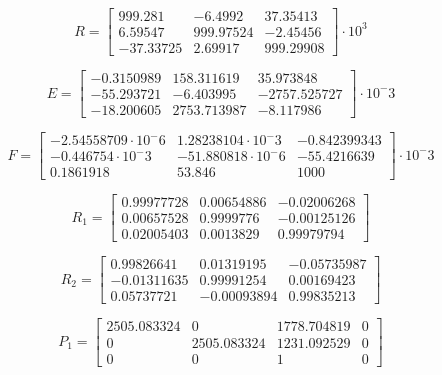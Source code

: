 \begin{equation}\label{eq::R}
R = \begin{bmatrix}
999.281 & -6.4992 & 37.35413 \\
6.59547 & 999.97524 & -2.45456 \\
-37.33725 & 2.69917 & 999.29908
\end{bmatrix}\cdot10^3
\end{equation}

\begin{equation}\label{eq::E}
E = \begin{bmatrix}
-0.3150989 & 158.311619 & 35.973848 \\
-55.293721 & -6.403995 & -2757.525727 \\
-18.200605 & 2753.713987 & -8.117986
\end{bmatrix}\cdot10^-3
\end{equation}

\begin{equation}\label{eq::F}
F = \begin{bmatrix}
-2.54558709\cdot10^-6 & 1.28238104\cdot10^-3 & -0.842399343\\
-0.446754\cdot10^-3 & -51.880818\cdot10^-6 & -55.4216639\\
0.1861918 & 53.846 & 1000
\end{bmatrix}\cdot10^-3
\end{equation}

\begin{equation}\label{eq::R1}
R_1 = \begin{bmatrix}
0.99977728 & 0.00654886 & -0.02006268\\
0.00657528 & 0.9999776 & -0.00125126\\
0.02005403 & 0.0013829 & 0.99979794
\end{bmatrix}
\end{equation}

\begin{equation}\label{eq::R2}
R_2 = \begin{bmatrix}
0.99826641 & 0.01319195 & -0.05735987\\
-0.01311635 & 0.99991254 & 0.00169423\\
0.05737721 & -0.00093894 & 0.99835213
\end{bmatrix}
\end{equation}

\begin{equation}\label{eq::P1}
P_1 = \begin{bmatrix}
2505.083324 & 0 & 1778.704819 & 0\\
0 & 2505.083324 & 1231.092529  & 0\\
0 & 0 & 1 & 0
\end{bmatrix}
\end{equation}

